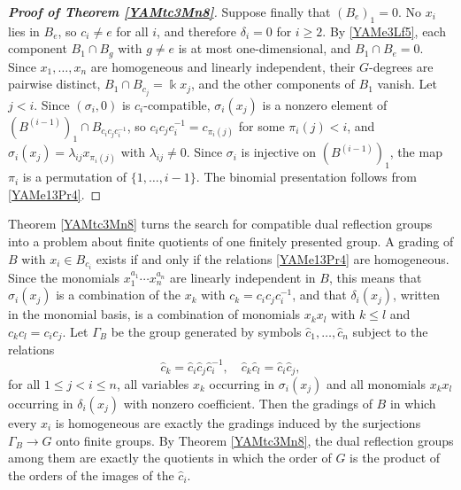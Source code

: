 \documentclass[reqno]{amsart}
\numberwithin{equation}{section}
\theoremstyle{definition}
\theoremstyle{remark}
\theoremstyle{plain}
\newcommand{\kk}{\Bbbk}
\begin{document}
\begin{proof}[\textnormal{\bfseries Proof of Theorem \ref{YAMtc3Mn8}}]
Suppose finally that $(B_e)_1=0$. No $x_i$ lies in $B_e$, so $c_i\neq e$ for all $i$, and therefore $\delta_i=0$ for $i\ge2$. By \eqref{YAMe3Lf5}, each component $B_1\cap B_g$ with $g\neq e$ is at most one-dimensional, and $B_1\cap B_e=0$. Since $x_1,\dots,x_n$ are homogeneous and linearly independent, their $G$-degrees are pairwise distinct, $B_1\cap B_{c_j}=\kk x_j$, and the other components of $B_1$ vanish. Let $j<i$. Since $(\sigma_i,0)$ is $c_i$-compatible, $\sigma_i(x_j)$ is a nonzero element of $(B^{(i-1)})_1\cap B_{c_ic_jc_i^{-1}}$, so $c_ic_jc_i^{-1}=c_{\pi_i(j)}$ for some $\pi_i(j)<i$, and $\sigma_i(x_j)=\lambda_{ij}x_{\pi_i(j)}$ with $\lambda_{ij}\neq0$. Since $\sigma_i$ is injective on $(B^{(i-1)})_1$, the map $\pi_i$ is a permutation of $\{1,\dots,i-1\}$. The binomial presentation follows from \eqref{YAMe13Pr4}.
\end{proof}

Theorem \ref{YAMtc3Mn8} turns the search for compatible dual reflection groups into a problem about finite quotients of one finitely presented group. A grading of $B$ with $x_i\in B_{c_i}$ exists if and only if the relations \eqref{YAMe13Pr4} are homogeneous. Since the monomials $x_1^{a_1}\cdots x_n^{a_n}$ are linearly independent in $B$, this means that $\sigma_i(x_j)$ is a combination of the $x_k$ with $c_k=c_ic_jc_i^{-1}$, and that $\delta_i(x_j)$, written in the monomial basis, is a combination of monomials $x_kx_l$ with $k\le l$ and $c_kc_l=c_ic_j$. Let $\Gamma_B$ be the group generated by symbols $\hat c_1,\dots,\hat c_n$ subject to the relations
\[
\hat c_k=\hat c_i\hat c_j\hat c_i^{-1},\quad\hat c_k\hat c_l=\hat c_i\hat c_j,
\]
for all $1\le j<i\le n$, all variables $x_k$ occurring in $\sigma_i(x_j)$ and all monomials $x_kx_l$ occurring in $\delta_i(x_j)$ with nonzero coefficient. Then the gradings of $B$ in which every $x_i$ is homogeneous are exactly the gradings induced by the surjections $\Gamma_B\to G$ onto finite groups. By Theorem \ref{YAMtc3Mn8}, the dual reflection groups among them are exactly the quotients in which the order of $G$ is the product of the orders of the images of the $\hat c_i$.
\end{document}
